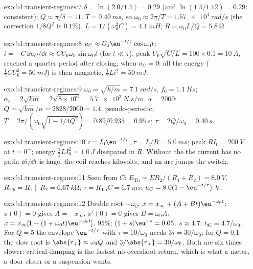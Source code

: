 \begin{solution}{exo:b1:transient-regimes:7}
$\delta = \ln(2.0/1.5) = 0.29$ (and $\ln(1.5/1.12) = 0.29$: consistent);
$Q \approx \pi/\delta = 11$. $T = \qty{0.40}{ms}$, so $\omega_0 \approx
2\pi/T = \qty{1.57e4}{rad/s}$ (the correction $1/8Q^2$ is $0.1\%$).
$L = 1/(\omega_0^2 C) = \qty{4.1}{mH}$; $R = \omega_0 L/Q = \qty{5.8}{\ohm}$.
\end{solution}

\begin{solution}{exo:b1:transient-regimes:8}
$u_C \approx U_0\eu^{-t/\tau}\cos\omega_0 t$; $i = -C\,\dd u_C/\dd t
\approx CU_0\omega_0\sin\omega_0 t$ (for $t \ll \tau$), peak $U_0\sqrt{C/L}
= 100 \times 0.1 = \qty{10}{A}$, reached a quarter period after closing,
when $u_C = 0$: all the energy ($\tfrac12 CU_0^2 = \qty{50}{mJ}$) is then
magnetic, $\tfrac12 Li^2 = \qty{50}{mJ}$.
\end{solution}

\begin{solution}{exo:b1:transient-regimes:9}
$\omega_0 = \sqrt{k/m} = \qty{7.1}{rad/s}$, $f_0 = \qty{1.1}{Hz}$;
$\alpha_c = 2\sqrt{km} = 2\sqrt{8\times10^6} = \qty{5.7e3}{N.s/m}$.
$\alpha = 2000$: $Q = \sqrt{km}/\alpha = 2828/2000 = 1.4$, pseudo-periodic;
$T = 2\pi/(\omega_0\sqrt{1 - 1/4Q^2}) = 0.89/0.935 = \qty{0.95}{s}$;
$\tau = 2Q/\omega_0 = \qty{0.40}{s}$.
\end{solution}

\begin{solution}{exo:b1:transient-regimes:10}
$i = I_0\eu^{-t/\tau}$, $\tau = L/R = \qty{5.0}{ms}$; peak 
$RI_0 = \qty{200}{V}$ at $t = 0^+$; energy $\tfrac12 LI_0^2 = \qty{1.0}{J}$
dissipated in $R$. Without the  the current has no path:
$\dd i/\dd t$ is huge, the coil  reaches kilovolts, and an arc
jumps the switch.
\end{solution}

\begin{solution}{exo:b1:transient-regimes:11}
Seen from $C$: $E_{\mathrm{Th}} = ER_2/(R_1 + R_2) = \qty{8.0}{V}$,
$R_{\mathrm{Th}} = R_1 \parallel R_2 = \qty{6.67}{k\ohm}$; $\tau =
R_{\mathrm{Th}}C = \qty{6.7}{ms}$; $u_C = 8.0(1 - \eu^{-t/\tau})$ V.
\end{solution}

\begin{solution}{exo:b1:transient-regimes:12}
Double root $-\omega_0$: $x = x_\infty + (A + Bt)\eu^{-\omega_0 t}$;
$x(0) = 0$ gives $A = -x_\infty$, $x'(0) = 0$ gives $B = \omega_0 A$:
$x = x_\infty[1 - (1 + \omega_0 t)\eu^{-\omega_0 t}]$. $95\%$:
$(1 + s)\eu^{-s} = 0.05$, $s \approx 4.7$: $t_{95} = 4.7/\omega_0$. For
$Q = 5$ the envelope $\eu^{-t/\tau}$ with $\tau = 10/\omega_0$ needs
$3\tau = 30/\omega_0$; for $Q = 0.1$ the slow root is $\abs{r_+} \approx
\omega_0 Q$ and $3/\abs{r_+} = 30/\omega_0$. Both are six times slower:
critical damping is the fastest no-overshoot return, which is what a
meter, a door closer or a suspension wants.
\end{solution}

